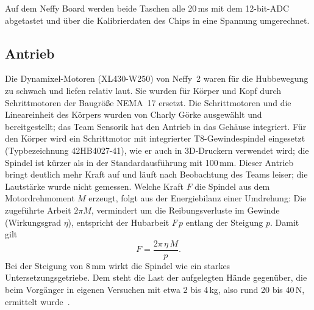 Auf dem Neffy Board werden beide Taschen alle 20\,ms mit dem 12-bit-\ac{ADC} abgetastet und
über die Kalibrierdaten des Chips in eine Spannung umgerechnet.

\subsection{Antrieb}
\label{sec:hw_antrieb}

Die Dynamixel-Motoren (XL430-W250) von Neffy~2 waren für die Hubbewegung zu schwach und
liefen relativ laut. Sie wurden für Körper und Kopf durch Schrittmotoren der Baugröße NEMA~17
ersetzt. Die Schrittmotoren und die Lineareinheit des Körpers wurden von Charly Görke ausgewählt und bereitgestellt; das Team Sensorik hat den Antrieb in das
Gehäuse integriert. Für den Körper wird ein Schrittmotor mit integrierter T8-Gewindespindel eingesetzt
(Typbezeichnung 42HB4027-41),
wie er auch in 3D-Druckern verwendet wird; die Spindel ist kürzer als in der Standardausführung
mit 100\,mm. Dieser Antrieb bringt deutlich mehr Kraft auf und läuft nach Beobachtung des
Teams leiser; die Lautstärke wurde nicht gemessen.
Welche Kraft $F$ die Spindel aus dem Motordrehmoment $M$ erzeugt, folgt aus der Energiebilanz
einer Umdrehung: Die zugeführte Arbeit $2\pi M$, vermindert um die Reibungsverluste im Gewinde
(Wirkungsgrad $\eta$), entspricht der Hubarbeit $F\,p$ entlang der Steigung $p$. Damit gilt
\begin{equation}
  F = \frac{2\pi\,\eta\,M}{p} .
  \label{eq:spindel}
\end{equation}
Bei der Steigung von 8\,mm wirkt die Spindel wie ein starkes Untersetzungsgetriebe. Dem steht die
Last der aufgelegten Hände gegenüber, die beim Vorgänger in eigenen Versuchen mit etwa 2 bis 4\,kg,
also rund 20 bis 40\,N, ermittelt wurde~\cite{goerke2025neffy2}.

